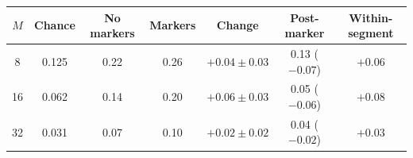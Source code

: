 \begin{tabular}{cc cc c cc}
\toprule
$M$ & Chance & No markers & Markers & Change & Post-marker & Within-segment \\
\midrule
8 & 0.125 & 0.22 & 0.26 & $+0.04 \pm 0.03$ & 0.13 ($-0.07$) & $+0.06$ \\
16 & 0.062 & 0.14 & 0.20 & $+0.06 \pm 0.03$ & 0.05 ($-0.06$) & $+0.08$ \\
32 & 0.031 & 0.07 & 0.10 & $+0.02 \pm 0.02$ & 0.04 ($-0.02$) & $+0.03$ \\
\bottomrule
\end{tabular}
